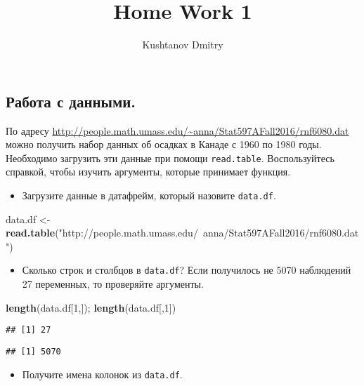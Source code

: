 \documentclass[]{article}
\title{Home Work 1}
\author{Kushtanov Dmitry}
\date{}
\newenvironment{Shaded}{\begin{snugshade}}{\end{snugshade}}
\newcommand{\KeywordTok}[1]{\textcolor[rgb]{0.13,0.29,0.53}{\textbf{#1}}}
\newcommand{\DecValTok}[1]{\textcolor[rgb]{0.00,0.00,0.81}{#1}}
\newcommand{\StringTok}[1]{\textcolor[rgb]{0.31,0.60,0.02}{#1}}
\newcommand{\NormalTok}[1]{#1}
\providecommand{\tightlist}{%
  \setlength{\itemsep}{0pt}\setlength{\parskip}{0pt}}
\begin{document}
\maketitle

\subsection{Работа с данными.}\label{--.}

По адресу
\url{http://people.math.umass.edu/~anna/Stat597AFall2016/rnf6080.dat}
можно получить набор данных об осадках в Канаде с 1960 по 1980 годы.
Необходимо загрузить эти данные при помощи \texttt{read.table}.
Воспользуйтесь справкой, чтобы изучить аргументы, которые принимает
функция.

\begin{itemize}
\tightlist
\item
  Загрузите данные в датафрейм, который назовите \texttt{data.df}.
\end{itemize}

\begin{Shaded}
\begin{Highlighting}[]
\NormalTok{data.df <-}\StringTok{ }\KeywordTok{read.table}\NormalTok{(}\StringTok{"http://people.math.umass.edu/~anna/Stat597AFall2016/rnf6080.dat"}\NormalTok{)}
\end{Highlighting}
\end{Shaded}

\begin{itemize}
\tightlist
\item
  Сколько строк и столбцов в \texttt{data.df}? Если получилось не 5070
  наблюдений 27 переменных, то проверяйте аргументы.
\end{itemize}

\begin{Shaded}
\begin{Highlighting}[]
\KeywordTok{length}\NormalTok{(data.df[}\DecValTok{1}\NormalTok{,]); }\KeywordTok{length}\NormalTok{(data.df[,}\DecValTok{1}\NormalTok{])}
\end{Highlighting}
\end{Shaded}

\begin{verbatim}
## [1] 27
\end{verbatim}

\begin{verbatim}
## [1] 5070
\end{verbatim}

\begin{itemize}
\tightlist
\item
  Получите имена колонок из \texttt{data.df}.
\end{itemize}
\end{document}
